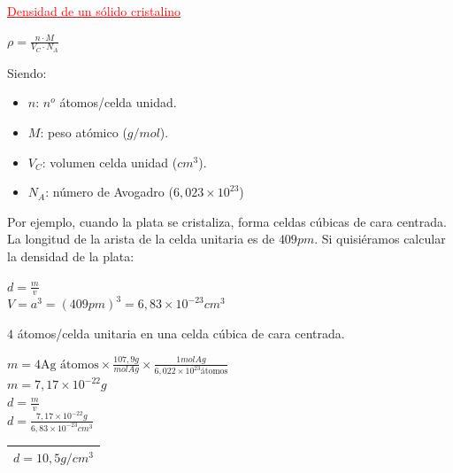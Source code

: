            \begin{center} \textcolor{red}{\underline{Densidad de un sólido cristalino}} \end{center}
            \begin{center} $\rho = \frac{n \cdot M}{V_C \cdot N_A}$ \end{center}
            Siendo:
            \begin{itemize}
                \item $n$: $n^o$ átomos/celda unidad.
                \item $M$: peso atómico ($g/mol$).
                \item $V_C$: volumen celda unidad ($cm^3$).
                \item $N_A$: número de Avogadro ($6,023 \times 10^{23}$)
            \end{itemize}
            \sangria{} Por ejemplo, cuando la plata se cristaliza, forma celdas cúbicas de cara centrada. La longitud de la arista de la celda unitaria es de $409pm$. Si quisiéramos calcular la densidad de la plata:
            \begin{center} $d = \frac{m}{v}$ \\[5pt] $V = a^3 = (409pm)^3 = 6,83 \times 10^{-23} cm^3$ \end{center}
            $4$ átomos/celda unitaria en una celda cúbica de cara centrada.
            \begin{center}
                $m = 4 \text{Ag átomos} \times \frac{107,9g}{molAg} \times \frac{1molAg}{6,022 \times 10^{23} \text{átomos}}$ \\[5pt] $ m = 7,17 \times 10^{-22}g$ \\[10pt] $d = \frac{m}{v}$ \\[5pt] $d = \frac{7,17 \times 10^{-22}g}{6,83 \times 10^{-23}cm^3}$ \\[5pt]
                \begin{tabular}{| c |} \hline $d = 10,5 g/cm^3$ \\ \hline \end{tabular}
            \end{center}
